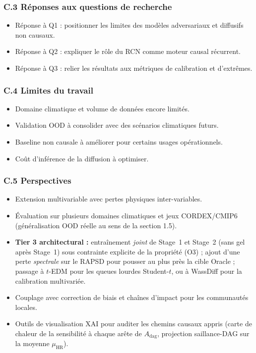 \documentclass[12pt,a4paper]{article}
\begin{document}
\subsubsection*{C.3 R\'eponses aux questions de recherche}
\begin{itemize}
    \item R\'eponse \`a Q1 : positionner les limites des mod\`eles adversariaux et diffusifs non causaux.
    \item R\'eponse \`a Q2 : expliquer le r\^ole du RCN comme moteur causal r\'ecurrent.
    \item R\'eponse \`a Q3 : relier les r\'esultats aux m\'etriques de calibration et d'extr\^emes.
\end{itemize}

\subsubsection*{C.4 Limites du travail}
\begin{itemize}
    \item Domaine climatique et volume de donn\'ees encore limit\'es.
    \item Validation OOD \`a consolider avec des sc\'enarios climatiques futurs.
    \item Baseline non causale \`a am\'eliorer pour certains usages op\'erationnels.
    \item Co\^ut d'inf\'erence de la diffusion \`a optimiser.
\end{itemize}

\subsubsection*{C.5 Perspectives}
\begin{itemize}
    \item Extension multivariable avec pertes physiques inter-variables.
    \item \'Evaluation sur plusieurs domaines climatiques et jeux CORDEX/CMIP6 (g\'en\'eralisation OOD r\'eelle au sens de la section 1.5).
    \item \textbf{Tier 3 architectural :} entra\^inement \emph{joint} de Stage~1 et Stage~2 (sans gel apr\`es Stage~1) sous contrainte explicite de la propri\'et\'e (O3) ; ajout d'une perte \emph{spectrale} sur le RAPSD pour pousser au plus pr\`es la cible Oracle ; passage \`a $t$-EDM \citep*{Pandey2024tEDM} pour les queues lourdes Student-$t$, ou \`a WassDiff \citep*{Liu2024WassDiff} pour la calibration multivari\'ee.
    \item Couplage avec correction de biais et cha\^ines d'impact pour les communaut\'es locales.
    \item Outils de visualisation XAI pour auditer les chemins causaux appris (carte de chaleur de la sensibilit\'e \`a chaque ar\^ete de $A_{\mathrm{dag}}$, projection saillance-DAG sur la moyenne $\mu_{\mathrm{HR}}$).
\end{itemize}
\end{document}

